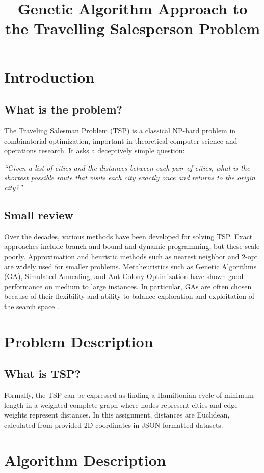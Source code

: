 \documentclass[conference]{IEEEtran}
\title{Genetic Algorithm Approach to the Travelling Salesperson Problem}
\author{
    \IEEEauthorblockN{Ignat Bojinov}
    \IEEEauthorblockA{StFX \\
    2025fve@stfx.ca}
}
\begin{document}
\maketitle

\section{Introduction}
\subsection{What is the problem?}
The Traveling Salesman Problem (TSP) is a classical NP-hard problem in combinatorial optimization, important in theoretical computer science and operations research. It asks a deceptively simple question: 

\emph{``Given a list of cities and the distances between each pair of cities, what is the shortest possible route that visits each city exactly once and returns to the origin city?''}

\subsection{Small review}
Over the decades, various methods have been developed for solving TSP. Exact approaches include branch-and-bound and dynamic programming, but these scale poorly. Approximation and heuristic methods such as nearest neighbor and 2-opt are widely used for smaller problems. Metaheuristics such as Genetic Algorithms (GA), Simulated Annealing, and Ant Colony Optimization have shown good performance on medium to large instances. In particular, GAs are often chosen because of their flexibility and ability to balance exploration and exploitation of the search space \cite{wikiTSP}.

\section{Problem Description}
\subsection{What is TSP?}
Formally, the TSP can be expressed as finding a Hamiltonian cycle of minimum length in a weighted complete graph where nodes represent cities and edge weights represent distances. In this assignment, distances are Euclidean, calculated from provided 2D coordinates in JSON-formatted datasets.

\section{Algorithm Description}
\end{document}
